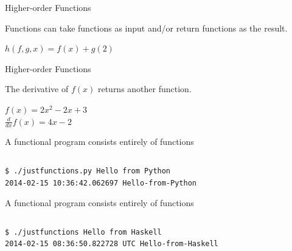 \documentclass[mathserif]{beamer}
\begin{document}
\begin{frame}{Higher-order Functions}

  {\Large Functions can take functions as input and/or return
    functions as the result.}

  \vskip5mm

  {\Huge $h(f, g, x) = f(x) + g(2)$}

\end{frame}

\begin{frame}{Higher-order Functions}

  {\Large The derivative of $f(x)$ returns another function.}

  \vskip5mm

  {\Large $f(x) = 2x^2 - 2x + 3$}\\
  {\Large $\frac{d}{dx} f(x) = 4x - 2$}


\end{frame}

\begin{frame}[fragile]{A functional program consists entirely of functions}

  \inputminted[firstline=6,lastline=15]{python}{code/python/justfunctions.py}

  \begin{verbatim}
$ ./justfunctions.py Hello from Python
2014-02-15 10:36:42.062697 Hello-from-Python
  \end{verbatim}

\end{frame}

\begin{frame}[fragile]{A functional program consists entirely of functions}

  \inputminted[firstline=5]{haskell}{code/haskell/justfunctions.hs}

  \begin{verbatim}
$ ./justfunctions Hello from Haskell
2014-02-15 08:36:50.822728 UTC Hello-from-Haskell
  \end{verbatim}

\end{frame}
\end{document}
